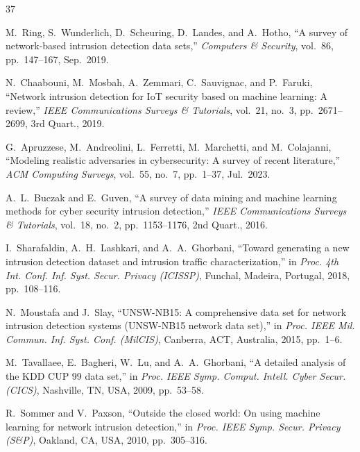 \documentclass[conference]{IEEEtran}
\begin{document}
\begin{thebibliography}{37}

M.~Ring, S.~Wunderlich, D.~Scheuring, D.~Landes, and A.~Hotho, ``A survey of network-based intrusion detection data sets,'' \textit{Computers \& Security}, vol.~86, pp.~147--167, Sep.~2019.

N.~Chaabouni, M.~Mosbah, A.~Zemmari, C.~Sauvignac, and P.~Faruki, ``Network intrusion detection for IoT security based on machine learning: A review,'' \textit{IEEE Communications Surveys \& Tutorials}, vol.~21, no.~3, pp.~2671--2699, 3rd Quart., 2019.

G.~Apruzzese, M.~Andreolini, L.~Ferretti, M.~Marchetti, and M.~Colajanni, ``Modeling realistic adversaries in cybersecurity: A survey of recent literature,'' \textit{ACM Computing Surveys}, vol.~55, no.~7, pp.~1--37, Jul.~2023.

A.~L.~Buczak and E.~Guven, ``A survey of data mining and machine learning methods for cyber security intrusion detection,'' \textit{IEEE Communications Surveys \& Tutorials}, vol.~18, no.~2, pp.~1153--1176, 2nd Quart., 2016.

I.~Sharafaldin, A.~H.~Lashkari, and A.~A.~Ghorbani, ``Toward generating a new intrusion detection dataset and intrusion traffic characterization,'' in \textit{Proc. 4th Int. Conf. Inf. Syst. Secur. Privacy (ICISSP)}, Funchal, Madeira, Portugal, 2018, pp.~108--116.

N.~Moustafa and J.~Slay, ``UNSW-NB15: A comprehensive data set for network intrusion detection systems (UNSW-NB15 network data set),'' in \textit{Proc. IEEE Mil. Commun. Inf. Syst. Conf. (MilCIS)}, Canberra, ACT, Australia, 2015, pp.~1--6.

M.~Tavallaee, E.~Bagheri, W.~Lu, and A.~A.~Ghorbani, ``A detailed analysis of the KDD CUP 99 data set,'' in \textit{Proc. IEEE Symp. Comput. Intell. Cyber Secur. (CICS)}, Nashville, TN, USA, 2009, pp.~53--58.

R.~Sommer and V.~Paxson, ``Outside the closed world: On using machine learning for network intrusion detection,'' in \textit{Proc. IEEE Symp. Secur. Privacy (S\&P)}, Oakland, CA, USA, 2010, pp.~305--316.


\end{thebibliography}
\end{document}
